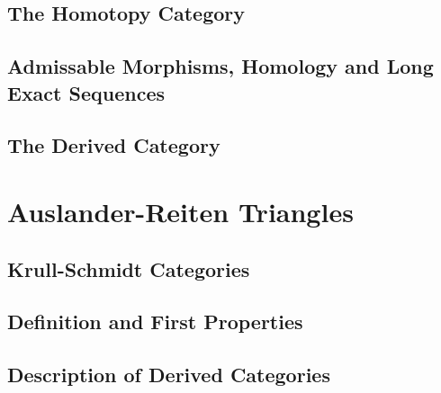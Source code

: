 \documentclass[12pt]{article}
\theoremstyle{definition}
\theoremstyle{remark}
\begin{document}
        \subsection{The Homotopy Category}

        \subsection{Admissable Morphisms, Homology and Long Exact Sequences}

        \subsection{The Derived Category}

    \clearpage
    
    \section{Auslander-Reiten Triangles}

        \subsection{Krull-Schmidt Categories}

        \subsection{Definition and First Properties}

        \subsection{Description of Derived Categories}

    \clearpage

    \nocite{*}
    
    

    \clearpage


\end{document}
